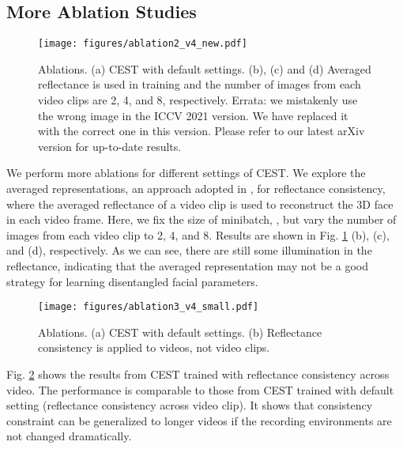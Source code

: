 \begin{appendix}
\subsection{More Ablation Studies}
\label{moreablation}
\begin{figure}[t]
  \centering
\renewcommand{\captionlabelfont}{\footnotesize}
  \texttt{[image: figures/ablation2\_v4\_new.pdf]}
  \caption{\footnotesize Ablations. (a) CEST with default settings. (b), (c) and (d) Averaged reflectance is used in training and the number of images from each video clips are 2, 4, and 8, respectively. {\color{gray}Errata: we mistakenly use the wrong image in the ICCV 2021 version. We have replaced it with the correct one in this version. Please refer to our latest arXiv version for up-to-date results.}}\label{fig:ablation2}
  \vspace{-0.1in}
\end{figure}

We perform more ablations for different settings of CEST. We explore the averaged representations, an approach adopted in \cite{tewari2019fml}, for reflectance consistency, where the averaged reflectance of a video clip is used to reconstruct the 3D face in each video frame. Here, we fix the size of minibatch, , but vary the number of images from each video clip to 2, 4, and 8. Results are shown in Fig. \ref{fig:ablation2} (b), (c), and (d), respectively. As we can see, there are still some illumination in the reflectance, indicating that the averaged representation may not be a good strategy for learning disentangled facial parameters. 


\begin{figure}[t]
  \centering
\renewcommand{\captionlabelfont}{\footnotesize}
  \texttt{[image: figures/ablation3\_v4\_small.pdf]}
  \caption{\footnotesize Ablations. (a) CEST with default settings. (b) Reflectance consistency is applied to videos, not video clips.}\label{fig:ablation3}
  \vspace{-0.1in}
\end{figure}
Fig. \ref{fig:ablation3} shows the results from CEST trained with reflectance consistency across video. The performance is comparable to those from CEST trained with default setting (reflectance consistency across video clip). It shows that consistency constraint can be generalized to longer videos if the recording environments are not changed dramatically.


\end{appendix}

